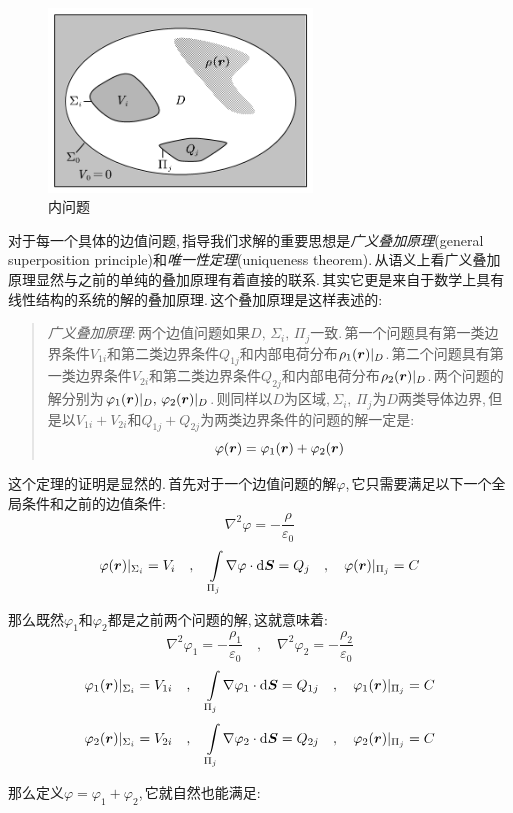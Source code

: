 \begin{figure}
\vspace{-0.2cm}
\centering
\includegraphics[width=7cm]{image/7-2-5.png}
\caption{内问题}
\end{figure}
对于每一个具体的边值问题,\,指导我们求解的重要思想是\emph{广义叠加原理}(general superposition principle)和\emph{唯一性定理}(uniqueness theorem).\,从语义上看广义叠加原理显然与之前的单纯的叠加原理有着直接的联系.\,其实它更是来自于数学上具有线性结构的系统的解的叠加原理.\,这个叠加原理是这样表述的:
\begin{verse}
\emph{广义叠加原理}:\,两个边值问题如果$D,\,\Sigma_i,\,\Pi_j$一致.\,第一个问题具有第一类边界条件$V_{1i}$和第二类边界条件$Q_{1j}$和内部电荷分布$\rho_1(\boldsymbol{r})|_D$.\,第二个问题具有第一类边界条件$V_{2i}$和第二类边界条件$Q_{2j}$和内部电荷分布$\rho_2(\boldsymbol{r})|_D$.\,两个问题的解分别为$\varphi_1(\boldsymbol{r})|_D,\,\varphi_2(\boldsymbol{r})|_D$.\,则同样以$D$为区域,\,$\Sigma_i,\,\Pi_j$为$D$两类导体边界,\,但是以$V_{1i}+V_{2i}$和$Q_{1j}+Q_{2j}$为两类边界条件的问题的解一定是:
\[\varphi(\boldsymbol{r})=\varphi_1(\boldsymbol{r})+\varphi_2(\boldsymbol{r})\]
\end{verse}

这个定理的证明是显然的.\,首先对于一个边值问题的解$\varphi$,\,它只需要满足以下一个全局条件和之前的边值条件:
\[\nabla^2\varphi=-\frac{\rho}{\varepsilon_0}\]
\[\varphi(\boldsymbol{r})|_{\Sigma_i}=V_i \quad, \quad \int\limits_{\Pi_j}\nabla\varphi\cdot \textrm{d} \boldsymbol{S}=Q_j \quad, \quad \varphi(\boldsymbol{r})|_{\Pi_j}=C\]

那么既然$\varphi_1$和$\varphi_2$都是之前两个问题的解,\,这就意味着:
\[\nabla^2\varphi_1=-\frac{\rho_1}{\varepsilon_0} \quad,\quad \nabla^2\varphi_2=-\frac{\rho_2}{\varepsilon_0}\]
\[\varphi_1(\boldsymbol{r})|_{\Sigma_i}=V_{1i} \quad, \quad \int\limits_{\Pi_j}\nabla\varphi_1\cdot \textrm{d} \boldsymbol{S}=Q_{1j} \quad, \quad \varphi_1(\boldsymbol{r})|_{\Pi_j}=C\]
\[\varphi_2(\boldsymbol{r})|_{\Sigma_i}=V_{2i} \quad, \quad \int\limits_{\Pi_j}\nabla\varphi_2\cdot \textrm{d} \boldsymbol{S}=Q_{2j} \quad, \quad \varphi_2(\boldsymbol{r})|_{\Pi_j}=C\]

那么定义$\varphi=\varphi_1+\varphi_2$,\,它就自然也能满足:

